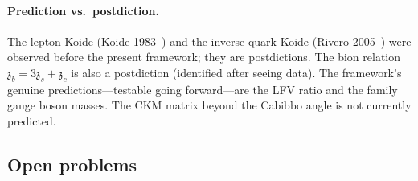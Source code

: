 \documentclass[aps,prd,twocolumn,showpacs,preprintnumbers,superscriptaddress,floatfix]{revtex4-2}
\newcommand{\zch}{\mathfrak{z}}
\begin{document}
\paragraph{Prediction vs.\ postdiction.}
The lepton Koide (Koide 1983~\cite{Koide:1983qe}) and the
inverse quark Koide (Rivero 2005~\cite{Rivero:2005b}) were
observed before the present framework; they are postdictions.
The bion relation $\zch_b = 3\zch_s + \zch_c$ is also a
postdiction (identified after seeing data).
The framework's genuine predictions---testable going forward---are
the LFV ratio and the family gauge boson masses.
The CKM matrix beyond the Cabibbo angle is not currently
predicted.


\subsection{Open problems}
\label{sec:open_problems}
\end{document}
